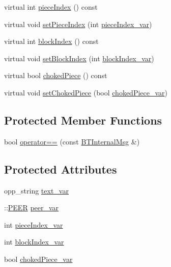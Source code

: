 \begin{DoxyCompactItemize}
virtual int \hyperlink{classBTInternalMsg_a408ca06b66f3f1e4680925e6dee51a1c}{piece\+Index} () const 
\item 
virtual void \hyperlink{classBTInternalMsg_a6c96a1f240dd338dec85988abd54ae25}{set\+Piece\+Index} (int \hyperlink{classBTInternalMsg_a74c9e0793d23162bc836a76b78812d88}{piece\+Index\+\_\+var})
\item 
virtual int \hyperlink{classBTInternalMsg_a7a302c1aa5c2aec0829596105213405d}{block\+Index} () const 
\item 
virtual void \hyperlink{classBTInternalMsg_a6a9cfced7412b37f41b23895bbc05951}{set\+Block\+Index} (int \hyperlink{classBTInternalMsg_a9be734970c7a790c56f41915016518cf}{block\+Index\+\_\+var})
\item 
virtual bool \hyperlink{classBTInternalMsg_a38d6f81246543abd935b5d7699f08d16}{choked\+Piece} () const 
\item 
virtual void \hyperlink{classBTInternalMsg_a139833e3fe32ffb3753b723334e761ae}{set\+Choked\+Piece} (bool \hyperlink{classBTInternalMsg_a364b051cdf4428a35ba41b23ee59f103}{choked\+Piece\+\_\+var})
\end{DoxyCompactItemize}
\subsection*{Protected Member Functions}
\begin{DoxyCompactItemize}
\item 
bool \hyperlink{classBTInternalMsg_a44c349d38925d3441076d28f5465d8f9}{operator==} (const \hyperlink{classBTInternalMsg}{B\+T\+Internal\+Msg} \&)
\end{DoxyCompactItemize}
\subsection*{Protected Attributes}
\begin{DoxyCompactItemize}
\item 
opp\+\_\+string \hyperlink{classBTInternalMsg_a8c02d34494805be9a533ffd978c02420}{text\+\_\+var}
\item 
\+::\hyperlink{structPEER}{P\+E\+E\+R} \hyperlink{classBTInternalMsg_aedc6acce926c31ae1d032110de29e871}{peer\+\_\+var}
\item 
int \hyperlink{classBTInternalMsg_a74c9e0793d23162bc836a76b78812d88}{piece\+Index\+\_\+var}
\item 
int \hyperlink{classBTInternalMsg_a9be734970c7a790c56f41915016518cf}{block\+Index\+\_\+var}
\item 
bool \hyperlink{classBTInternalMsg_a364b051cdf4428a35ba41b23ee59f103}{choked\+Piece\+\_\+var}
\end{DoxyCompactItemize}


